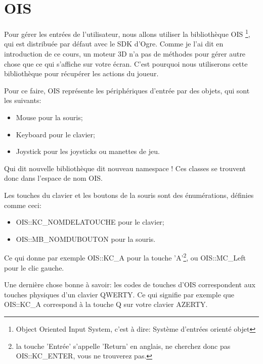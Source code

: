 \section{OIS}


Pour gérer les entrées de l'utilisateur, nous allons utiliser la bibliothèque OIS \footnote{Object Oriented Input System, c'est à dire: Système d'entrées orienté objet}, qui est distribuée par défaut avec le SDK d'Ogre. Comme je l'ai dit en introduction de ce cours, un moteur 3D n'a pas de méthodes pour gérer autre chose que ce qui s'affiche sur votre écran. C'est pourquoi nous utiliserons cette bibliothèque pour récupérer les actions du joueur.\newline


Pour ce faire, OIS représente les périphériques d'entrée par des objets, qui sont les suivants:

\begin{itemize}
\item Mouse pour la souris;
\item Keyboard pour le clavier;
\item Joystick pour les joysticks ou manettes de jeu.\newline
\end{itemize}
    



Qui dit nouvelle bibliothèque dit nouveau namespace ! Ces classes se trouvent donc dans l'espace de nom OIS.\newline

Les touches du clavier et les boutons de la souris sont des énumérations, définies comme ceci:

\begin{itemize}
\item OIS::KC\_NOMDELATOUCHE pour le clavier;
\item OIS::MB\_NOMDUBOUTON pour la souris.
\end{itemize}


Ce qui donne par exemple OIS::KC\_A pour la touche 'A'\footnote{la touche 'Entrée' s'appelle 'Return' en anglais, ne cherchez donc pas OIS::KC\_ENTER, vous ne trouverez pas.}, ou OIS::MC\_Left pour le clic gauche.\newline

Une dernière chose bonne à savoir: les codes de touches d'OIS correspondent aux touches physiques d'un clavier QWERTY. Ce qui signifie par exemple que OIS::KC\_A correspond à la touche Q sur votre clavier AZERTY.\newline

